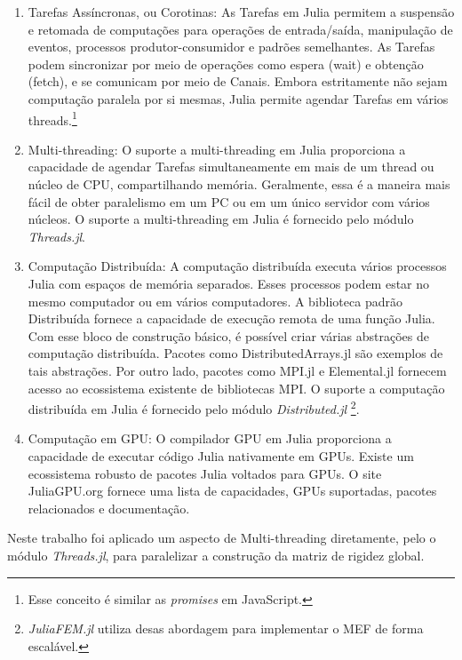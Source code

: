 \begin{enumerate}
    \item Tarefas Assíncronas, ou Corotinas:
    As Tarefas em Julia permitem a suspensão e retomada de computações para operações de entrada/saída, manipulação de eventos, processos produtor-consumidor e padrões semelhantes. As Tarefas podem sincronizar por meio de operações como espera (wait) e obtenção (fetch), e se comunicam por meio de Canais. Embora estritamente não sejam computação paralela por si mesmas, Julia permite agendar Tarefas em vários threads.\footnote{Esse conceito é similar as \emph{promises} em JavaScript.}

    \item Multi-threading:
    O suporte a multi-threading em Julia proporciona a capacidade de agendar Tarefas simultaneamente em mais de um thread ou núcleo de CPU, compartilhando memória. Geralmente, essa é a maneira mais fácil de obter paralelismo em um PC ou em um único servidor com vários núcleos. O suporte a multi-threading em Julia é fornecido pelo módulo \emph{Threads.jl}.

    \item Computação Distribuída:
    A computação distribuída executa vários processos Julia com espaços de memória separados. Esses processos podem estar no mesmo computador ou em vários computadores. A biblioteca padrão Distribuída fornece a capacidade de execução remota de uma função Julia. Com esse bloco de construção básico, é possível criar várias abstrações de computação distribuída. Pacotes como DistributedArrays.jl são exemplos de tais abstrações. Por outro lado, pacotes como MPI.jl e Elemental.jl fornecem acesso ao ecossistema existente de bibliotecas MPI. O suporte a computação distribuída em Julia é fornecido pelo módulo \emph{Distributed.jl} \footnote{\emph{JuliaFEM.jl} utiliza desas abordagem para implementar o MEF de forma escalável.}.

    \item Computação em GPU:
    O compilador GPU em Julia proporciona a capacidade de executar código Julia nativamente em GPUs. Existe um ecossistema robusto de pacotes Julia voltados para GPUs. O site JuliaGPU.org fornece uma lista de capacidades, GPUs suportadas, pacotes relacionados e documentação.
\end{enumerate}


Neste trabalho foi aplicado um aspecto de Multi-threading diretamente, pelo o módulo \emph{Threads.jl}, para paralelizar a construção da matriz de rigidez global.

